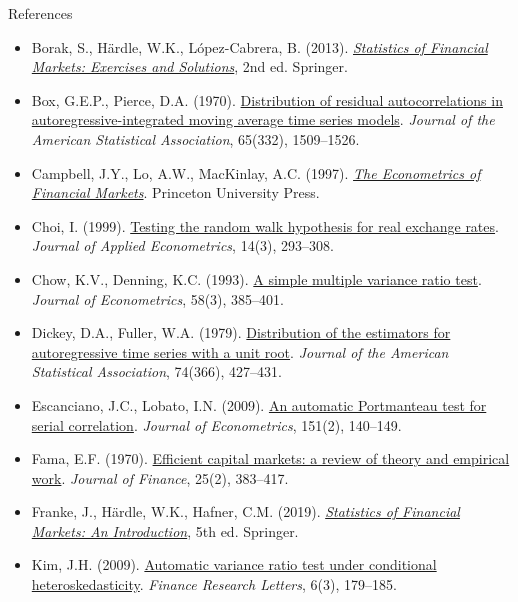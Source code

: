 \begin{frame}{References}
\itemsize{\tiny}
\begin{itemize}
    \item Borak, S., Härdle, W.K., López-Cabrera, B. (2013). \href{https://doi.org/10.1007/978-3-642-33929-5}{\textit{Statistics of Financial Markets: Exercises and Solutions}}, 2nd ed. Springer.
    \item Box, G.E.P., Pierce, D.A. (1970). \href{https://doi.org/10.1080/01621459.1970.10481180}{Distribution of residual autocorrelations in autoregressive-integrated moving average time series models}. \textit{Journal of the American Statistical Association}, 65(332), 1509--1526.
    \item Campbell, J.Y., Lo, A.W., MacKinlay, A.C. (1997). \href{https://doi.org/10.1515/9781400830213}{\textit{The Econometrics of Financial Markets}}. Princeton University Press.
    \item Choi, I. (1999). \href{https://doi.org/10.1002/(SICI)1099-1255(199905/06)14:3<293::AID-JAE503>3.0.CO;2-5}{Testing the random walk hypothesis for real exchange rates}. \textit{Journal of Applied Econometrics}, 14(3), 293--308.
    \item Chow, K.V., Denning, K.C. (1993). \href{https://doi.org/10.1016/0304-4076(93)90051-6}{A simple multiple variance ratio test}. \textit{Journal of Econometrics}, 58(3), 385--401.
    \item Dickey, D.A., Fuller, W.A. (1979). \href{https://doi.org/10.1080/01621459.1979.10482531}{Distribution of the estimators for autoregressive time series with a unit root}. \textit{Journal of the American Statistical Association}, 74(366), 427--431.
    \item Escanciano, J.C., Lobato, I.N. (2009). \href{https://doi.org/10.1016/j.jeconom.2009.03.001}{An automatic Portmanteau test for serial correlation}. \textit{Journal of Econometrics}, 151(2), 140--149.
    \item Fama, E.F. (1970). \href{https://doi.org/10.1111/j.1540-6261.1970.tb00518.x}{Efficient capital markets: a review of theory and empirical work}. \textit{Journal of Finance}, 25(2), 383--417.
    \item Franke, J., Härdle, W.K., Hafner, C.M. (2019). \href{https://doi.org/10.1007/978-3-030-13751-9}{\textit{Statistics of Financial Markets: An Introduction}}, 5th ed. Springer.
    \item Kim, J.H. (2009). \href{https://doi.org/10.1016/j.frl.2009.04.003}{Automatic variance ratio test under conditional heteroskedasticity}. \textit{Finance Research Letters}, 6(3), 179--185.

\end{itemize}
\end{frame}
